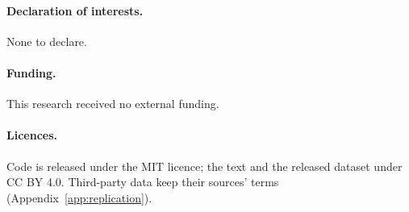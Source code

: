 \paragraph{Declaration of interests.} None to declare.

\paragraph{Funding.} This research received no external funding.

\paragraph{Licences.} Code is released under the MIT licence; the text and the released dataset
under CC BY 4.0. Third-party data keep their sources' terms (Appendix~\ref{app:replication}).
